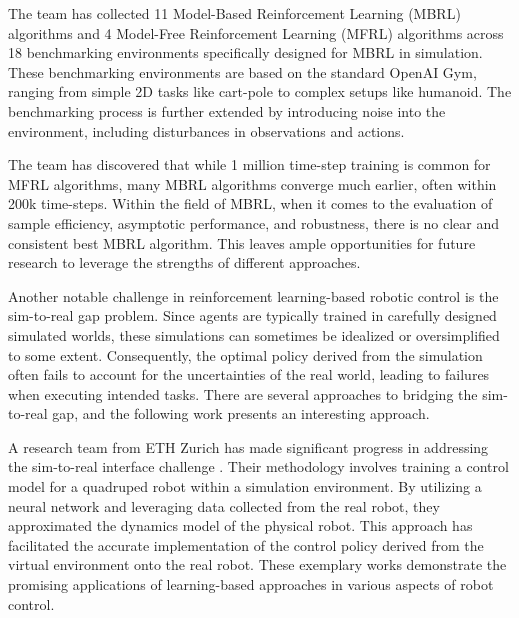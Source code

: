 The team has collected 11 Model-Based Reinforcement Learning (MBRL) algorithms and 4 Model-Free Reinforcement Learning (MFRL) algorithms across 18 benchmarking environments specifically designed for MBRL in simulation. These benchmarking environments are based on the standard OpenAI Gym\cite{brockman2016openai}, ranging from simple 2D tasks like cart-pole to complex setups like humanoid. The benchmarking process is further extended by introducing noise into the environment, including disturbances in observations and actions.

The team has discovered that while 1 million time-step training is common for MFRL algorithms, many MBRL algorithms converge much earlier, often within 200k time-steps. Within the field of MBRL, when it comes to the evaluation of sample efficiency, asymptotic performance, and robustness, there is no clear and consistent best MBRL algorithm. This leaves ample opportunities for future research to leverage the strengths of different approaches.

Another notable challenge in reinforcement learning-based robotic control is the sim-to-real gap problem. Since agents are typically trained in carefully designed simulated worlds, these simulations can sometimes be idealized or oversimplified to some extent. Consequently, the optimal policy derived from the simulation often fails to account for the uncertainties of the real world, leading to failures when executing intended tasks. There are several approaches to bridging the sim-to-real gap, and the following work presents an interesting approach.

A research team from ETH Zurich has made significant progress in addressing the sim-to-real interface challenge \cite{hwangbo2019learning}. Their methodology involves training a control model for a quadruped robot within a simulation environment. By utilizing a neural network and leveraging data collected from the real robot, they approximated the dynamics model of the physical robot. This approach has facilitated the accurate implementation of the control policy derived from the virtual environment onto the real robot. These exemplary works demonstrate the promising applications of learning-based approaches in various aspects of robot control.

